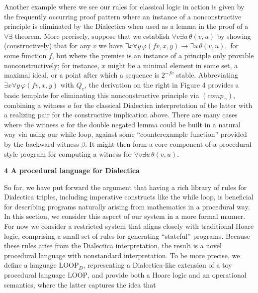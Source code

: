\documentclass[10pt,a4paper]{article}
\begin{document}
 
 
Another example where we see our rules for classical logic in action is given by the frequently occurring proof pattern where an instance of a nonconstructive principle is eliminated by the Dialectica when used as a lemma in the proof of a $\forall\exists$-theorem. More precisely, suppose that we establish $\forall v\exists u\,\theta(v,u)$ by showing (constructively) that for any $v$ we have $\exists x\forall y\,\varphi(fv,x,y)\to\exists u\,\theta(v,u),$ for some function $f$, but where the premise is an instance of a principle only provable nonconstructively; for instance, $x$ might be a minimal element in some set, a maximal ideal, or a point after which a sequence is $2^{-fv}$ stable. Abbreviating $\exists x\forall y\,\varphi(fv,x,y)$ with $Q_{v}$, the derivation on the right in Figure 4 provides a basic template for eliminating this nonconstructive principle via $(comp_{\neg})$, combining a witness $a$ for the classical Dialectica interpretation of the latter with a realizing pair for the constructive implication above. There are many cases where the witness $a$ for the double negated lemma could be built in a natural way via using our while loop, against some “counterexample function” provided by the backward witness $\beta$. It might then form a core component of a procedural-style program for computing a witness for $\forall v\exists u\,\theta(v,u)$.\par
 
 
 
 


 
\par\medskip\noindent\textbf{4 A procedural language for Dialectica}\par
 
 
So far, we have put forward the argument that having a rich library of rules for Dialectica triples, including imperative constructs like the while loop, is beneficial for describing programs naturally arising from mathematics in a procedural way. In this section, we consider this aspect of our system in a more formal manner. For now we consider a restricted system that aligns closely with traditional Hoare logic, comprising a small set of rules for generating “stateful” programs. Because these rules arise from the Dialectica interpretation, the result is a novel procedural language with nonstandard interpretation. To be more precise, we define a language $\mathrm{LOOP}_{D}$, representing a Dialectica-like extension of a toy procedural language $\mathrm{LOOP}$, and provide both a Hoare logic and an operational semantics, where the latter captures the idea that\par
  
\end{document}
